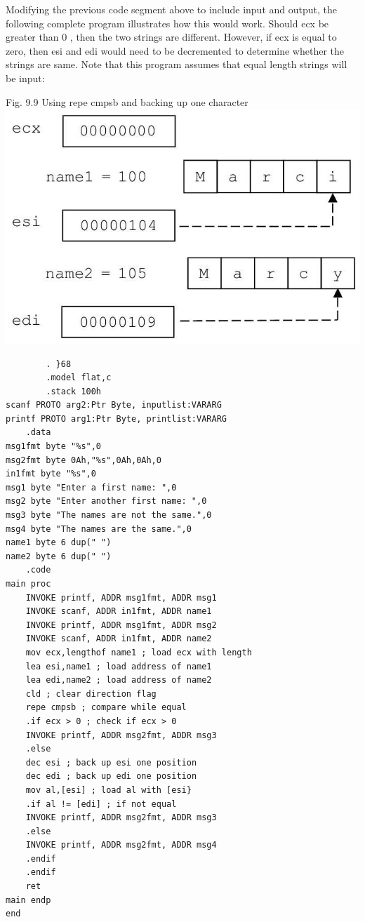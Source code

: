 \documentclass[10pt]{article}
\begin{document}
Modifying the previous code segment above to include input and output, the following complete program illustrates how this would work. Should ecx be greater than 0 , then the two strings are different. However, if ecx is equal to zero, then esi and edi would need to be decremented to determine whether the strings are same. Note that this program assumes that equal length strings will be input:

Fig. 9.9 Using repe cmpsb and backing up one character\\
\includegraphics[max width=\textwidth, center]{2025_03_24_ebe50cc223a6fbc49eecg-212}

\begin{verbatim}
        . }68
        .model flat,c
        .stack 100h
scanf PROTO arg2:Ptr Byte, inputlist:VARARG
printf PROTO arg1:Ptr Byte, printlist:VARARG
    .data
msg1fmt byte "%s",0
msg2fmt byte 0Ah,"%s",0Ah,0Ah,0
in1fmt byte "%s",0
msg1 byte "Enter a first name: ",0
msg2 byte "Enter another first name: ",0
msg3 byte "The names are not the same.",0
msg4 byte "The names are the same.",0
name1 byte 6 dup(" ")
name2 byte 6 dup(" ")
    .code
main proc
    INVOKE printf, ADDR msg1fmt, ADDR msg1
    INVOKE scanf, ADDR in1fmt, ADDR name1
    INVOKE printf, ADDR msg1fmt, ADDR msg2
    INVOKE scanf, ADDR in1fmt, ADDR name2
    mov ecx,lengthof name1 ; load ecx with length
    lea esi,name1 ; load address of name1
    lea edi,name2 ; load address of name2
    cld ; clear direction flag
    repe cmpsb ; compare while equal
    .if ecx > 0 ; check if ecx > 0
    INVOKE printf, ADDR msg2fmt, ADDR msg3
    .else
    dec esi ; back up esi one position
    dec edi ; back up edi one position
    mov al,[esi] ; load al with [esi}
    .if al != [edi] ; if not equal
    INVOKE printf, ADDR msg2fmt, ADDR msg3
    .else
    INVOKE printf, ADDR msg2fmt, ADDR msg4
    .endif
    .endif
    ret
main endp
end
\end{verbatim}
\end{document}
